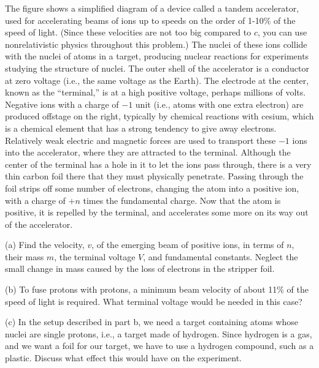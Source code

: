 The figure shows a simplified diagram of a device called a tandem
accelerator, used for accelerating beams of ions up to speeds on the
order of 1-10\% of the speed of light. (Since these velocities are not
too big compared to $c$, you can use nonrelativistic physics
throughout this problem.) The nuclei of these ions collide with the
nuclei of atoms in a target, producing nuclear reactions for
experiments studying the structure of nuclei. The outer shell of the
accelerator is a conductor at zero voltage (i.e., the same voltage as
the Earth). The electrode at the center, known as the ``terminal,'' is
at a high positive voltage, perhaps millions of volts.  Negative ions
with a charge of $-1$ unit (i.e., atoms with one extra electron) are
produced offstage on the right, typically by chemical reactions with
cesium, which is a chemical element that has a strong tendency to give
away electrons. Relatively weak electric and magnetic forces are used
to transport these $-1$ ions into the accelerator, where they are
attracted to the terminal. Although the center of the terminal has a
hole in it to let the ions pass through, there is a very thin carbon
foil there that they must physically penetrate. Passing through the
foil strips off some number of electrons, changing the atom into a
positive ion, with a charge of $+n$ times the fundamental charge. Now
that the atom is positive, it is repelled by the terminal, and
accelerates some more on its way out of the accelerator. 

(a) Find the velocity, $v$, of the emerging beam of positive ions, in
terms of $n$, their mass $m$, the terminal voltage $V$, and
fundamental constants. Neglect the small change in mass caused by the
loss of electrons in the stripper foil.\answercheck\hwendpart

(b) To fuse protons with protons, a minimum beam velocity of
about 11\% of the speed of light is required. What terminal
voltage would be needed in this case?\answercheck\hwendpart

(c) In the setup described in part b, we need a target
containing atoms whose nuclei are single protons, i.e., a target
made of hydrogen. Since hydrogen is a gas, and we want a foil
for our target, we have to use a hydrogen compound, such as
a plastic. Discuss what effect this would have on the experiment.
